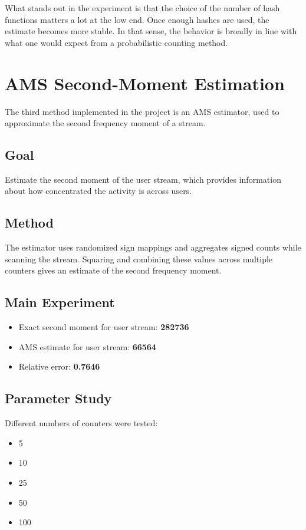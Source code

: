 \documentclass[11pt,a4paper]{article}
\begin{document}
What stands out in the experiment is that the choice of the number of hash functions matters a lot at the low end. Once enough hashes are used, the estimate becomes more stable. In that sense, the behavior is broadly in line with what one would expect from a probabilistic counting method.

\section{AMS Second-Moment Estimation}

The third method implemented in the project is an AMS estimator, used to approximate the second frequency moment of a stream.

\subsection*{Goal}
Estimate the second moment of the user stream, which provides information about how concentrated the activity is across users.

\subsection*{Method}
The estimator uses randomized sign mappings and aggregates signed counts while scanning the stream. Squaring and combining these values across multiple counters gives an estimate of the second frequency moment.

\subsection*{Main Experiment}
\begin{itemize}
    \item Exact second moment for user stream: \textbf{282736}
    \item AMS estimate for user stream: \textbf{66564}
    \item Relative error: \textbf{0.7646}
\end{itemize}

\subsection*{Parameter Study}
Different numbers of counters were tested:
\begin{itemize}
    \item 5
    \item 10
    \item 25
    \item 50
    \item 100
\end{itemize}
\end{document}
